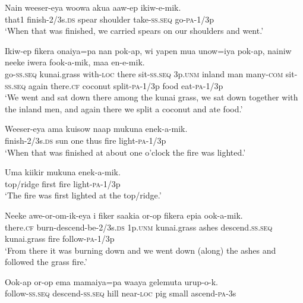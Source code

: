 {\ea\label{ex:a:x6}
\gll  Nain  weeser-eya  woowa  akua  aaw-ep  ikiw-e-mik. \\
that1  finish-2/3s.\textsc{ds}  spear  shoulder  take-\textsc{ss.seq}  go-\textsc{pa}-1/3p \\
\glt ‘When that was finished, we carried spears on our shoulders and went.’ \\
\z


\ea\label{ex:a:x7}
\gll  Ikiw-ep  fikera  onaiya=pa  nan  pok-ap,  wi  yapen  mua            unow=iya  pok-ap,  nainiw  neeke  iwera  fook-a-mik,           maa  en-e-mik. \\
go-\textsc{ss.seq}  kunai.grass  with-\textsc{loc}  there  sit-\textsc{ss.seq}  3p.\textsc{unm}  inland  man  many-\textsc{com}  sit-\textsc{ss.seq}  again  there.\textsc{cf}  coconut  split-\textsc{pa}-1/3p  food  eat-\textsc{pa}-1/3p \\




\glt ‘We went and sat down there among the kunai grass, we sat down together with the inland men, and again there we split a coconut and ate food.’ \\
\z


\ea\label{ex:a:x8}
\gll  Weeser-eya  ama  kuisow  naap  mukuna  enek-a-mik. \\
finish-2/3s.\textsc{ds}  sun  one  thus  fire  light-\textsc{pa}-1/3p \\
\glt ‘When that was finished at about one o’clock the fire was lighted.’ \\
\z


\ea\label{ex:a:x9}
\gll  Uma  kiikir  mukuna  enek-a-mik. \\
top/ridge  first  fire  light-\textsc{pa}-1/3p \\
\glt ‘The fire was first lighted at the top/ridge.’ \\
\z


\ea\label{ex:a:x10}
\gll  Neeke  awe-or-om-ik-eya  i  fiker  saakia                or-op  fikera  epia  ook-a-mik. \\
there.\textsc{cf}  burn-descend-be-2/3s.\textsc{ds}  1p.\textsc{unm}  kunai.grass  ashes  descend.\textsc{ss.seq}  kunai.grass  fire  follow-\textsc{pa}-1/3p \\


\glt ‘From there it was burning down and we went down (along) the ashes and followed the grass fire.’ \\
\z


\ea\label{ex:a:x11}
\gll  Ook-ap  or-op  ema  mamaiya=pa  waaya  gelemuta         urup-o-k. \\
follow-\textsc{ss.seq}  descend-\textsc{ss.seq}  hill  near-\textsc{loc}  pig  small     ascend-\textsc{pa}-3s \\


}
